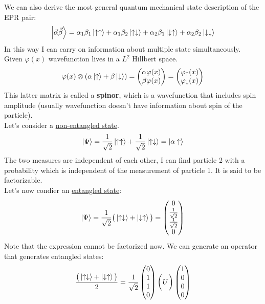 We can also derive the most general quantum mechanical state description of the EPR pair:
\[
\ket{\vec{\alpha}\vec{\beta}}=\alpha_1\beta_1\ket{\uparrow\uparrow}+\alpha_1\beta_2\ket{\uparrow\downarrow}+\alpha_2\beta_1\ket{\downarrow\uparrow}+\alpha_2\beta_2\ket{\downarrow\downarrow}
\]
In this way I can carry on information about multiple state simultaneously.\\
\newline
Given $\varphi(x)$ wavefunction lives in a \emph{$L^2$} Hillbert space.\\
\[
\varphi(x)\otimes(\alpha\ket{\uparrow}+\beta\ket{\downarrow})=\begin{pmatrix}\alpha\varphi(x)\\\beta\varphi(x)\end{pmatrix}=\begin{pmatrix}\varphi_{\uparrow}(x)\\\varphi_{\downarrow}(x)\end{pmatrix}
\]
This latter matrix is called a \textbf{spinor}, which is a wavefunction that includes spin amplitude (usually wavefunction doesn't have information about spin of the particle).\\
Let's consider a \underline{non-entangled state}.
\[
\ket{\Psi}=\frac{1}{\sqrt{2}}\ket{\uparrow\uparrow}+\frac{1}{\sqrt{2}}\ket{\uparrow\downarrow}=\ket{\alpha\uparrow}
\]
The two measures are independent of each other, I can find particle 2 with a probability which is independent of the measurement of particle 1. It is said to be factorizable.\\
Let's now condier an \underline{entangled state}:
\[
\ket{\Psi}=\frac{1}{\sqrt{2}}\big(\ket{\uparrow\downarrow}+\ket{\downarrow\uparrow}\big) = \begin{pmatrix}0\\\frac{1}{\sqrt{2}}\\\frac{1}{\sqrt{2}}\\0\end{pmatrix}
\]
Note that the expression cannot be factorized now. We can generate an operator that generates entangled states:
\[
\frac{\big(\ket{\uparrow\downarrow}+\ket{\downarrow\uparrow}\big)}{2}=\frac{1}{\sqrt{2}}\begin{pmatrix}0\\1\\1\\0\end{pmatrix}\bigg(U\bigg)\begin{pmatrix}1\\0\\0\\0\end{pmatrix}
\]
